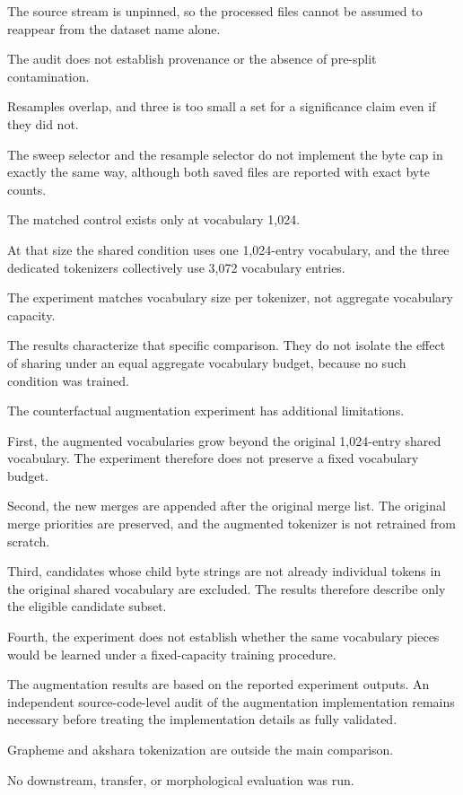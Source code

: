 \documentclass[10pt,twocolumn]{article}
\begin{document}
The source stream is unpinned, so the processed files
cannot be assumed to reappear from the dataset name alone.

The audit does not establish provenance or the absence
of pre-split contamination.

Resamples overlap, and three is too small a set for
a significance claim even if they did not.

The sweep selector and the resample selector do not
implement the byte cap in exactly the same way, although
both saved files are reported with exact byte counts.

The matched control exists only at vocabulary 1,024.

At that size the shared condition uses one 1,024-entry
vocabulary, and the three dedicated tokenizers
collectively use 3,072 vocabulary entries.

The experiment matches vocabulary size per tokenizer,
not aggregate vocabulary capacity.

The results characterize that specific comparison.
They do not isolate the effect of sharing under an
equal aggregate vocabulary budget, because no such
condition was trained.

The counterfactual augmentation experiment has additional
limitations.

First, the augmented vocabularies grow beyond the
original 1,024-entry shared vocabulary. The experiment
therefore does not preserve a fixed vocabulary budget.

Second, the new merges are appended after the original
merge list. The original merge priorities are preserved,
and the augmented tokenizer is not retrained from
scratch.

Third, candidates whose child byte strings are not
already individual tokens in the original shared
vocabulary are excluded. The results therefore describe
only the eligible candidate subset.

Fourth, the experiment does not establish whether the
same vocabulary pieces would be learned under a
fixed-capacity training procedure.

The augmentation results are based on the reported
experiment outputs. An independent source-code-level
audit of the augmentation implementation remains
necessary before treating the implementation details
as fully validated.

Grapheme and akshara tokenization are outside the
main comparison.

No downstream, transfer, or morphological evaluation
was run.
\end{document}
